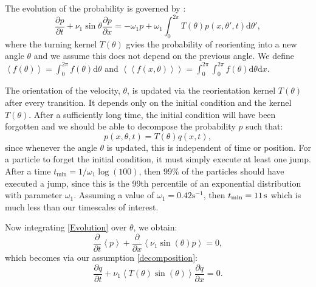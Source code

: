 \documentclass[twocolumn]{biophys}
\def\mean#1{\left< #1 \right>}
\begin{document}
The evolution of the probability is governed \citep{othmer1988models} by :
\begin{equation}\label{Evolution}
 \frac{\partial p}{\partial t} + \nu_1 \sin{\theta } \frac{\partial p}{\partial x} = -\omega_1 p + \omega_1 \int_0^{2\pi} T(\theta) p(x,\theta ', t) \text{d} \theta ',
\end{equation}
where the turning kernel $T(\theta)$ gvies the probability of reorienting into a new angle $\theta$ and we assume this does not depend on the previous angle.
We define $\mean{f(\theta)} = \int_0^{2\pi} f(\theta) \text{d} \theta $ and $\mean{\mean{f(x,\theta)}} =  \int_{0}^{2\pi} \int_0^{2\pi} f(\theta) \text{d} \theta \text{d}  x $.

The orientation of the velocity, $\theta$, is updated via the reorientation kernel $T(\theta)$ after every transition.
It depends only on the initial condition and the kernel $T(\theta)$.
After a sufficiently long time, the initial condition will have been forgotten and we should be able to decompose the probability $p$ such that:
\begin{equation}\label{decomposition}
 p(x,\theta , t) = T(\theta) q(x,t),
\end{equation}
since whenever the angle $\theta$ is updated, this is independent of time or position. 
For a particle to forget the initial condition, it must simply execute at least one jump. 
After a time $t_{\text{min}} = 1/\omega_1 \log (100)$, then $99\%$ of the particles should have executed a jump, since this is the 99th percentile of an exponential distribution with parameter $\omega_1$.
Assuming a value of $\omega_1 = 0.42 \text{s}^{-1}$, then $t_{\text{min}} = 11 \hspace{0.5mm} \text{s}$ which is much less than our timescales of interest. 

Now integrating \eqref{Evolution} over $\theta$, we obtain:
\begin{equation}
 \frac{\partial}{\partial t} \mean{p} + \frac{\partial}{\partial x} \mean{\nu_1 \sin(\theta) p} = 0,
\end{equation}
which becomes via our assumption \eqref{decomposition}: 
\begin{equation}
 \frac{\partial q}{\partial t} + \nu_1 \mean{T(\theta) \sin(\theta)} \frac{\partial q}{\partial x} = 0.
\end{equation}
\end{document}
